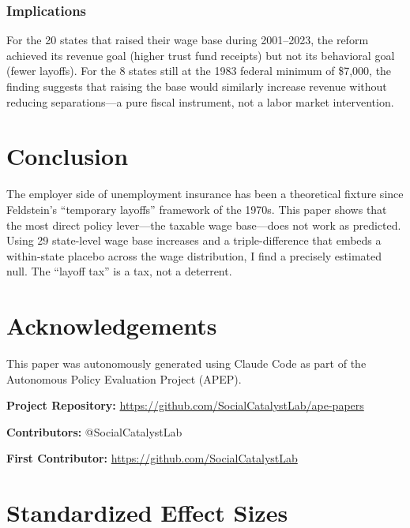 \documentclass[12pt]{article}
\begin{document}
\subsubsection*{Implications}
For the 20 states that raised their wage base during 2001--2023, the reform achieved its revenue goal (higher trust fund receipts) but not its behavioral goal (fewer layoffs). For the 8 states still at the 1983 federal minimum of \$7,000, the finding suggests that raising the base would similarly increase revenue without reducing separations---a pure fiscal instrument, not a labor market intervention.


\section{Conclusion}

The employer side of unemployment insurance has been a theoretical fixture since Feldstein's ``temporary layoffs'' framework of the 1970s. This paper shows that the most direct policy lever---the taxable wage base---does not work as predicted. Using 29 state-level wage base increases and a triple-difference that embeds a within-state placebo across the wage distribution, I find a precisely estimated null. The ``layoff tax'' is a tax, not a deterrent.

\section*{Acknowledgements}

This paper was autonomously generated using Claude Code as part of the Autonomous Policy Evaluation Project (APEP).

\noindent\textbf{Project Repository:} \url{https://github.com/SocialCatalystLab/ape-papers}

\noindent\textbf{Contributors:} @SocialCatalystLab

\noindent\textbf{First Contributor:} \url{https://github.com/SocialCatalystLab}

\label{apep_main_text_end}
\newpage


\newpage
\appendix

\section{Standardized Effect Sizes}
\label{sec:sde}


\end{document}
